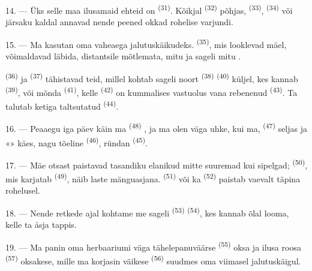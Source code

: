 14. --- Üks selle maa ilusamaid ehteid on  \textsuperscript{(31)}. Kõikjal
 \textsuperscript{(32)} põhjas,  \textsuperscript{(33)},
 \textsuperscript{(34)} või järsaku kaldal annavad nende peened okkad
rohelise varjundi.

\VUsaut{3.0mm}
\VUsaut{3.0mm}

15. --- Ma kasutan oma vaheaega  jalutuskäikudeks. 
\textsuperscript{(35)}, mis looklevad mäel, võimaldavad läbida, distantsile mõtlemata,
mitu  ja sageli mitu .

 \textsuperscript{(36)} ja  \textsuperscript{(37)}
tähistavad teid, millel kohtab sageli noort  \textsuperscript{(38)}
 \textsuperscript{(40)} küljel, kes kannab 
\textsuperscript{(39)}, või mõnda  \textsuperscript{(41)}, kelle
 \textsuperscript{(42)} on kummalises vastuolus vana rebenenud
 \textsuperscript{(43)}. Ta talutab ketiga taltsutatud 
\textsuperscript{(44)}.

\VUsaut{3.0mm}

16. --- Peaaegu iga päev käin ma  \textsuperscript{(48)}
, ja ma olen väga uhke, kui ma, 
\textsuperscript{(47)} seljas ja «» käes, nagu tõeline 
\textsuperscript{(46)}, ründan  \textsuperscript{(45)}.

17. --- Mäe otsast paistavad tasandiku elanikud mitte suuremad kui sipelgad;
 \textsuperscript{(50)}, mis karjatab 
\textsuperscript{(49)}, näib laste mänguasjana.  \textsuperscript{(51)} või ka
 \textsuperscript{(52)} paistab vaevalt täpina rohelusel.

18. --- Nende retkede ajal kohtame me sageli  \textsuperscript{(53)}
 \textsuperscript{(54)}, kes kannab õlal looma, kelle ta äsja
tappis.

19. --- Ma panin oma herbaariumi väga tähelepanuväärse 
\textsuperscript{(55)} oksa ja ilusa roosa  \textsuperscript{(57)} oksakese,
mille ma korjasin väikese  \textsuperscript{(56)} suudmes oma viimasel
jalutuskäigul.

